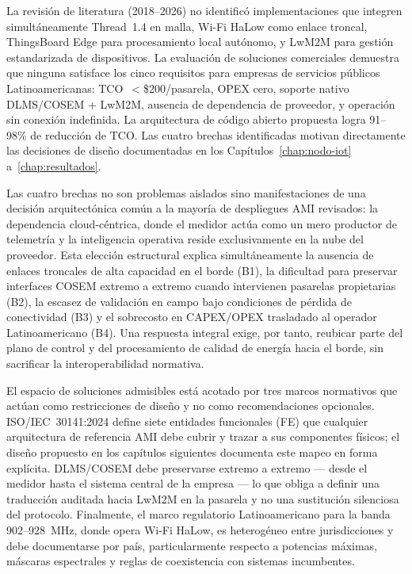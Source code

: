 La revisión de literatura (2018--2026) no identificó implementaciones que integren simultáneamente Thread~1.4 en malla, Wi-Fi HaLow como enlace troncal, ThingsBoard Edge para procesamiento local autónomo, y LwM2M para gestión estandarizada de dispositivos. La evaluación de soluciones comerciales demuestra que ninguna satisface los cinco requisitos para empresas de servicios públicos Latinoamericanas: TCO~$<$\$200/pasarela, OPEX cero, soporte nativo DLMS/COSEM + LwM2M, ausencia de dependencia de proveedor, y operación sin conexión indefinida. La arquitectura de código abierto propuesta logra 91--98\% de reducción de TCO. Las cuatro brechas identificadas motivan directamente las decisiones de diseño documentadas en los Capítulos~\ref{chap:nodo-iot} a~\ref{chap:resultados}.

Las cuatro brechas no son problemas aislados sino manifestaciones de una decisión arquitectónica común a la mayoría de despliegues AMI revisados: la dependencia cloud-céntrica, donde el medidor actúa como un mero productor de telemetría y la inteligencia operativa reside exclusivamente en la nube del proveedor. Esta elección estructural explica simultáneamente la ausencia de enlaces troncales de alta capacidad en el borde (B1), la dificultad para preservar interfaces COSEM extremo a extremo cuando intervienen pasarelas propietarias (B2), la escasez de validación en campo bajo condiciones de pérdida de conectividad (B3) y el sobrecosto en CAPEX/OPEX trasladado al operador Latinoamericano (B4). Una respuesta integral exige, por tanto, reubicar parte del plano de control y del procesamiento de calidad de energía hacia el borde, sin sacrificar la interoperabilidad normativa.

El espacio de soluciones admisibles está acotado por tres marcos normativos que actúan como restricciones de diseño y no como recomendaciones opcionales. ISO/IEC~30141:2024 define siete entidades funcionales (FE) que cualquier arquitectura de referencia AMI debe cubrir y trazar a sus componentes físicos; el diseño propuesto en los capítulos siguientes documenta este mapeo en forma explícita. DLMS/COSEM debe preservarse extremo a extremo --- desde el medidor hasta el sistema central de la empresa --- lo que obliga a definir una traducción auditada hacia LwM2M en la pasarela y no una sustitución silenciosa del protocolo. Finalmente, el marco regulatorio Latinoamericano para la banda 902--928~MHz, donde opera Wi-Fi HaLow, es heterogéneo entre jurisdicciones y debe documentarse por país, particularmente respecto a potencias máximas, máscaras espectrales y reglas de coexistencia con sistemas incumbentes.

